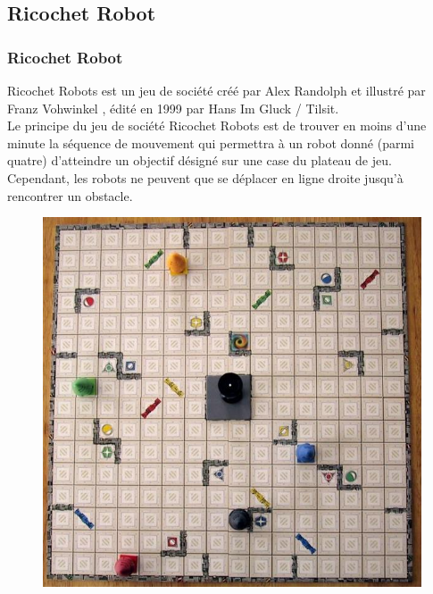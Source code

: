 \documentclass{beamer}
\begin{document}
	\subsection{Ricochet Robot}
	\begin{frame}
		\frametitle{Ricochet Robot}
		
		Ricochet Robots est un jeu de société créé par Alex Randolph et illustré par Franz 
		Vohwinkel , édité en 1999 par Hans Im Gluck / Tilsit.
		\\Le principe du jeu de société Ricochet Robots est de trouver en moins d’une
		minute la séquence de mouvement qui permettra à un robot donné (parmi
		quatre) d’atteindre un objectif désigné sur une case du plateau de jeu. 
		Cependant, les robots ne peuvent que se déplacer en ligne droite jusqu’à rencontrer
		un obstacle.
		
		\begin{figure}[htpb]
			\includegraphics[scale=0.16]{./images/9.jpg}
		\end{figure}
		
	\end{frame}
	
\end{document}
